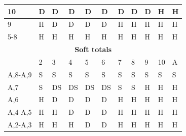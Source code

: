 \documentclass[conference]{IEEEtran}
\begin{document}
\begin{table}[ht]
\begin{tabular}{|l|l|l|l|l|l|l|l|l|l|l|}
10                           & \cellcolor{blue!25}D & \cellcolor{blue!25}D & \cellcolor{blue!25}D & \cellcolor{blue!25}D & \cellcolor{blue!25}D & \cellcolor{blue!25}D & \cellcolor{blue!25}D & \cellcolor{blue!25}D & \cellcolor{green!50}H & \cellcolor{green!50}H \\ \hline
9                            & \cellcolor{green!50}H & \cellcolor{blue!25}D & \cellcolor{blue!25}D & \cellcolor{blue!25}D & \cellcolor{blue!25}D & \cellcolor{green!50}H & \cellcolor{green!50}H & \cellcolor{green!50}H & \cellcolor{green!50}H & \cellcolor{green!50}H  \\ \hline
5-8                          & \cellcolor{green!50}H & \cellcolor{green!50}H & \cellcolor{green!50}H & \cellcolor{green!50}H & \cellcolor{green!50}H & \cellcolor{green!50}H & \cellcolor{green!50}H & \cellcolor{green!50}H & \cellcolor{green!50}H & \cellcolor{green!50}H \\ \hline \hline

\multicolumn{11}{|c|}{\textbf{Soft totals}}                           \\ \hline
                             & 2 & 3 & 4 & 5 & 6 & 7 & 8 & 9 & 10 & A \\ \hline
A,8-A,9                      & \cellcolor{red!75}S & \cellcolor{red!75}S & \cellcolor{red!75}S & \cellcolor{red!75}S & \cellcolor{red!75}S & \cellcolor{red!75}S & \cellcolor{red!75}S & \cellcolor{red!75}S & \cellcolor{red!75}S & \cellcolor{red!75}S  \\ \hline
A,7                          & \cellcolor{red!75}S & \cellcolor{blue!25}DS & \cellcolor{blue!25}DS & \cellcolor{blue!25}DS & \cellcolor{blue!25}DS & \cellcolor{red!75}S & \cellcolor{red!75}S & \cellcolor{green!50}H & \cellcolor{green!50}H & \cellcolor{green!50}H  \\ \hline
A,6                          & \cellcolor{green!50}H & \cellcolor{blue!25}D & \cellcolor{blue!25}D & \cellcolor{blue!25}D & \cellcolor{blue!25}D & \cellcolor{green!50}H & \cellcolor{green!50}H & \cellcolor{green!50}H & \cellcolor{green!50}H & \cellcolor{green!50}H  \\ \hline
A,4-A,5                      & \cellcolor{green!50}H & \cellcolor{green!50}H & \cellcolor{blue!25}D & \cellcolor{blue!25}D & \cellcolor{blue!25}D & \cellcolor{green!50}H & \cellcolor{green!50}H & \cellcolor{green!50}H & \cellcolor{green!50}H & \cellcolor{green!50}H  \\ \hline
A,2-A,3                      & \cellcolor{green!50}H & \cellcolor{green!50}H & \cellcolor{green!50}H & \cellcolor{blue!25}D & \cellcolor{blue!25}D & \cellcolor{green!50}H & \cellcolor{green!50}H & \cellcolor{green!50}H & \cellcolor{green!50}H & \cellcolor{green!50}H  \\ \hline \hline


\end{tabular}
\end{table}
\end{document}
